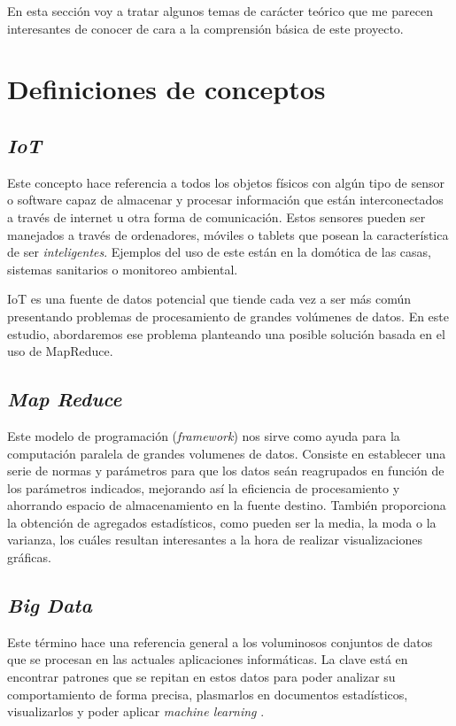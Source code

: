 
En esta sección voy a tratar algunos temas de carácter teórico que me parecen interesantes de conocer de cara a la comprensión básica de este proyecto.

\section{Definiciones de conceptos}
\subsection{\textit{IoT}} 
Este concepto hace referencia a todos los objetos físicos con algún tipo de sensor o software capaz de almacenar y procesar información que están interconectados a través de internet u otra forma de comunicación\cite{IoT}. Estos sensores pueden ser manejados a través de ordenadores, móviles o tablets que posean la característica de ser \textit{inteligentes}. Ejemplos del uso de este están en la domótica de las casas, sistemas sanitarios o monitoreo ambiental.

IoT es una fuente de datos potencial que tiende cada vez a ser más común presentando problemas de procesamiento de grandes volúmenes de datos. En este estudio, abordaremos ese problema planteando una posible solución basada en el uso de MapReduce.

\subsection{\textit{Map Reduce}}
Este modelo de programación (\textit{framework}) nos sirve como ayuda para la computación paralela de grandes volumenes de datos\cite{MapReduce}. Consiste en establecer una serie de normas y parámetros para que los datos seán reagrupados en función de los parámetros indicados, mejorando así la eficiencia de procesamiento y ahorrando espacio de almacenamiento en la fuente destino. También proporciona la obtención de agregados estadísticos, como pueden ser la media, la moda o la varianza, los cuáles resultan interesantes a la hora de realizar visualizaciones gráficas.
\subsection{\textit{Big Data}}
Este término hace una referencia general a los voluminosos conjuntos de datos que se procesan en las actuales aplicaciones informáticas\cite{BigData1}. La clave está en encontrar patrones que se repitan en estos datos para poder analizar su comportamiento de forma precisa, plasmarlos en documentos estadísticos, visualizarlos y poder aplicar \textit{machine learning} \cite{BigData2}.
